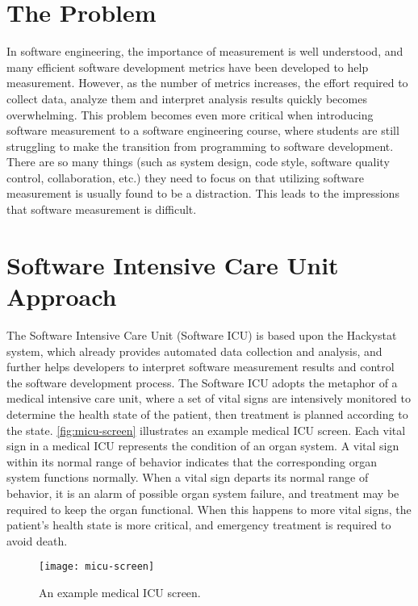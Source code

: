 \section{The Problem}
In software engineering, the importance of measurement is well understood, and many efficient software development metrics have been developed to help measurement. However, as the number of metrics increases, the effort required to collect data, analyze them and interpret analysis results quickly becomes overwhelming. This problem becomes even more critical when introducing software measurement to a software engineering course, where students are still struggling to make the transition from programming to software development. There are so many things (such as system design, code style, software quality control, collaboration, etc.) they need to focus on that utilizing software measurement is usually found to be a distraction. This leads to the impressions that software measurement is difficult. 

\section{Software Intensive Care Unit Approach}
The Software Intensive Care Unit (Software ICU) is based upon the Hackystat system, which already provides automated data collection and analysis, and further helps developers to interpret software measurement results and control the software development process. The Software ICU adopts the metaphor of a medical intensive care unit, where a set of vital signs are intensively monitored to determine the health state of the patient, then treatment is planned according to the state. \autoref{fig:micu-screen} illustrates an example medical ICU screen. Each vital sign in a medical ICU represents the condition of an organ system. A vital sign within its normal range of behavior indicates that the corresponding organ system functions normally. When a vital sign departs its normal range of behavior, it is an alarm of possible organ system failure, and treatment may be required to keep the organ functional. When this happens to more vital signs, the patient's health state is more critical, and emergency treatment is required to avoid death.

\begin{figure}[htbp]
   \centering
   \texttt{[image: micu-screen]}
   \caption{An example medical ICU screen.}
   \label{fig:micu-screen}
\end{figure}


